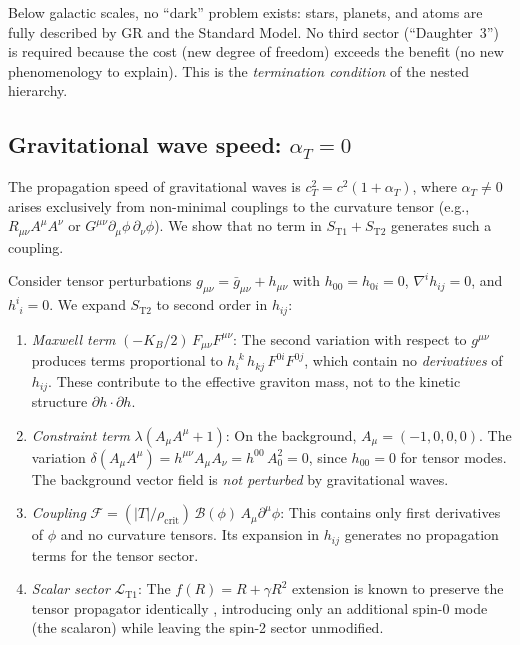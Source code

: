 \documentclass[aps,prd,twocolumn,superscriptaddress,nofootinbib]{revtex4-2}
\begin{document}
Below galactic scales, no ``dark'' problem exists: stars, planets, and atoms are fully described by GR and the Standard Model. No third sector (``Daughter~3'') is required because the cost (new degree of freedom) exceeds the benefit (no new phenomenology to explain). This is the \textit{termination condition} of the nested hierarchy.

\subsection{Gravitational wave speed: $\alpha_T = 0$}
\label{sec:alpha_T}

The propagation speed of gravitational waves is $c_T^2 = c^2(1 + \alpha_T)$, where $\alpha_T \neq 0$ arises exclusively from non-minimal couplings to the curvature tensor (e.g., $R_{\mu\nu}A^\mu A^\nu$ or $G^{\mu\nu}\partial_\mu\phi\,\partial_\nu\phi$). We show that no term in $S_{\mathrm{T1}} + S_{\mathrm{T2}}$ generates such a coupling.

Consider tensor perturbations $g_{\mu\nu} = \bar{g}_{\mu\nu} + h_{\mu\nu}$ with $h_{00} = h_{0i} = 0$, $\nabla^i h_{ij} = 0$, and $h^i_{\phantom{i}i} = 0$. We expand $S_{\mathrm{T2}}$ to second order in $h_{ij}$:

\begin{enumerate}
\item \textit{Maxwell term} $(-K_B/2)\,F_{\mu\nu}F^{\mu\nu}$: The second variation with respect to $g^{\mu\nu}$ produces terms proportional to $h_{i}^{\phantom{i}k}\,h_{kj}\,F^{0i}F^{0j}$, which contain no \textit{derivatives} of $h_{ij}$. These contribute to the effective graviton mass, not to the kinetic structure $\partial h \cdot \partial h$.

\item \textit{Constraint term} $\lambda(A_\mu A^\mu + 1)$: On the background, $A_\mu = (-1, 0, 0, 0)$. The variation $\delta(A_\mu A^\mu) = h^{\mu\nu}A_\mu A_\nu = h^{00}\,A_0^2 = 0$, since $h_{00} = 0$ for tensor modes. The background vector field is \textit{not perturbed} by gravitational waves.

\item \textit{Coupling} $\mathcal{F} = (|T|/\rho_{\mathrm{crit}})\,\mathcal{B}(\phi)\,A_\mu\partial^\mu\phi$: This contains only first derivatives of $\phi$ and no curvature tensors. Its expansion in $h_{ij}$ generates no propagation terms for the tensor sector.

\item \textit{Scalar sector} $\mathcal{L}_{\mathrm{T1}}$: The $f(R) = R + \gamma R^2$ extension is known to preserve the tensor propagator identically \cite{Starobinsky1980}, introducing only an additional spin-0 mode (the scalaron) while leaving the spin-2 sector unmodified.
\end{enumerate}
\end{document}
